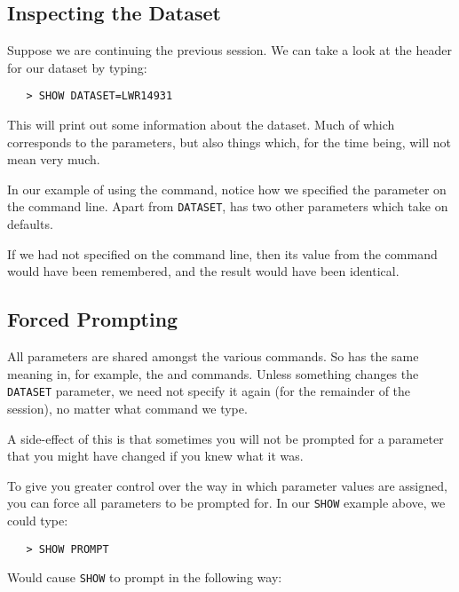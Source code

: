 \subsection{Inspecting the Dataset}

Suppose we are continuing the previous session.  We can take a look at the
header for our dataset by typing:

\begin{verbatim}
   > SHOW DATASET=LWR14931
\end{verbatim}

This will print out some information about the dataset.  Much of which
corresponds to the  parameters, but also
things which, for the time being, will not mean very much.

In our example of using the  command, notice how
we specified the
 parameter on the command line.  Apart
from \verb+DATASET+,  has two other parameters
which take on defaults.

If we had not specified  on the command
line, then its value from the  command
would have been remembered, and the result would have been identical.


\subsection{Forced Prompting}

All parameters are shared amongst the various commands.  So
 has
the same meaning in, for example, the
 and  commands.
Unless something changes the \verb+DATASET+ parameter, we need not specify it
again (for the remainder of the session), no matter what command we type.

A side-effect of this is that sometimes you will not be prompted for a
parameter that you might have changed if you knew what it was.

To give you greater control over the way in which parameter values are
assigned, you can force all parameters to be prompted for.  In our \verb+SHOW+
example above, we could type:

\begin{verbatim}
   > SHOW PROMPT
\end{verbatim}

Would cause \verb+SHOW+ to prompt in the following way:

